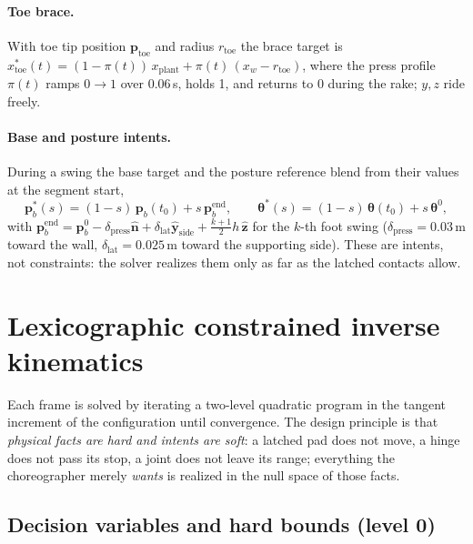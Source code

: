 \documentclass[11pt]{article}
\newcommand{\nhat}{\hat{\bm n}}
\newcommand{\zhat}{\hat{\bm z}}
\begin{document}
\paragraph{Toe brace.} With toe tip position $\bm p_{\mathrm{toe}}$ and radius
$r_{\mathrm{toe}}$ the brace target is
$x^*_{\mathrm{toe}}(t)=(1-\pi(t))\,x_{\mathrm{plant}}+\pi(t)\,(x_w-r_{\mathrm{toe}})$,
where the press profile $\pi(t)$ ramps $0\!\to\!1$ over $0.06$\,s, holds 1,
and returns to 0 during the rake; $y,z$ ride freely.

\paragraph{Base and posture intents.} During a swing the base target and the
posture reference blend from their values at the segment start,
\begin{equation}
  \bm p^*_b(s)=(1-s)\,\bm p_b(t_0)+s\,\bm p^{\mathrm{end}}_b,\qquad
  \bm\theta^*(s)=(1-s)\,\bm\theta(t_0)+s\,\bm\theta^0,
\end{equation}
with $\bm p^{\mathrm{end}}_b=\bm p^0_b-\delta_{\mathrm{press}}\nhat
+\delta_{\mathrm{lat}}\hat{\bm y}_{\mathrm{side}}+\tfrac{k+1}{2}h\,\zhat$ for
the $k$-th foot swing ($\delta_{\mathrm{press}}=0.03$\,m toward the wall,
$\delta_{\mathrm{lat}}=0.025$\,m toward the supporting side). These are
intents, not constraints: the solver realizes them only as far as the latched
contacts allow.

\section{Lexicographic constrained inverse kinematics}
\label{sec:ik}

Each frame is solved by iterating a two-level quadratic program in the
tangent increment of the configuration until convergence. The design
principle is that \emph{physical facts are hard and intents are soft}: a
latched pad does not move, a hinge does not pass its stop, a joint does not
leave its range; everything the choreographer merely \emph{wants} is realized
in the null space of those facts.

\subsection{Decision variables and hard bounds (level 0)}
\end{document}
